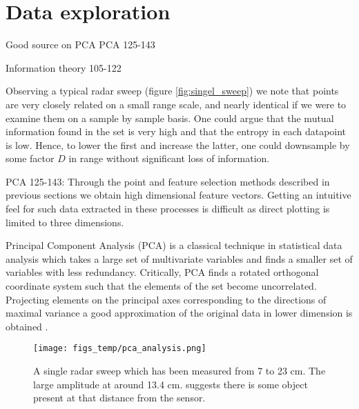\section{Data exploration}


Good source on PCA
\cite{hyvasrinen_karhunen_oja_2004}
PCA 125-143

Information theory
105-122

Observing a typical radar sweep (figure \ref{fig:singel_sweep}) we note that points are very closely related on a small range scale, and nearly identical if we were to examine them on a sample by sample basis. One could argue that the mutual information found in the set is very high and that the entropy in each datapoint is low. Hence, to lower the first and increase the latter, one could downsample by some factor $D$ in range without significant loss of information.


PCA 125-143: Through the point and feature selection methods described in previous sections we obtain high dimensional feature vectors. Getting an intuitive feel for such data extracted in these processes is difficult as direct plotting is limited to three dimensions. 

Principal Component Analysis (PCA) is  a classical technique in statistical data analysis which takes a large set of multivariate variables and finds a smaller set of variables with less redundancy. Critically, PCA finds a rotated orthogonal coordinate system such that the elements of the set become uncorrelated. Projecting elements on the principal axes corresponding to the directions of maximal variance a good approximation of the original data in lower dimension is obtained \citep{hyvasrinen_karhunen_oja_2004}.

\begin{figure}[h]
	\centering
	\texttt{[image: figs\_temp/pca\_analysis.png]}
	\caption{A single radar sweep which has been measured from 7 to 23 cm. The large amplitude at around 13.4 cm. suggests there is some object present at that distance from the sensor.}
	\label{fig:pca}
\end{figure}
